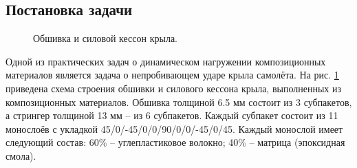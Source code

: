 \subsection*{Постановка задачи}
\begin{figure}[h]
\caption{Обшивка и силовой кессон крыла.}
\label{pic:construction}
\end{figure}
Одной из практических задач о динамическом нагружении композиционных материалов
является задача о непробивающем ударе крыла самолёта. На рис.
\ref{pic:construction} приведена схема строения обшивки и силового кессона
крыла, выполненных из композиционных материалов. Обшивка толщиной 6.5 мм состоит
из 3 субпакетов, а стрингер толщиной 13 мм -- из 6 субпакетов. Каждый субпакет
состоит из 11 монослоёв с укладкой 45/0/-45/0/0/90/0/0/-45/0/45. Каждый монослой
имеет следующий состав: 60\% -- углепластиковое волокно; 40\% -- матрица
(эпоксидная смола). 

